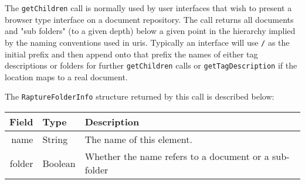 The \verb+getChildren+ call is normally used by user interfaces that wish
to present a browser type interface on a document repository. The call returns all documents
and "sub folders" (to a given depth) below a given point in the hierarchy implied
by the naming conventions used in uris. Typically an interface will use \verb+/+ as
the initial prefix and then append onto that prefix the names of either tag descriptions
or folders for further \verb+getChildren+ calls or \verb+getTagDescription+ if the location
maps to a real document.

The \verb+RaptureFolderInfo+ structure returned by this call is described below:

\begin{table}[H]
  \small
\begin{center}
\begin{tabular}{r l p{8cm}}
  Field & Type & Description \\
  \hline
  name & String & The name of this element. \\
  folder & Boolean & Whether the name refers to a document or a sub-folder \\
\end{tabular}
\end{center}
\end{table}
